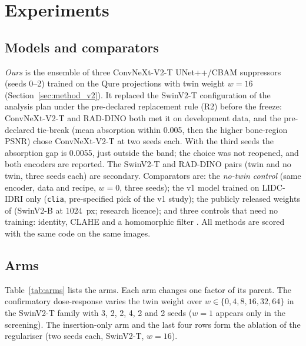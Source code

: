 \section{Experiments}
\label{sec:experiments}
\subsection{Models and comparators}
\emph{Ours} is the ensemble of three ConvNeXt-V2-T UNet++/CBAM suppressors (seeds 0--2) trained on the Qure projections with twin weight $w=16$
(Section~\ref{sec:method_v2}). It replaced the SwinV2-T configuration of the analysis plan under the pre-declared replacement rule (R2) before the
freeze: ConvNeXt-V2-T and RAD-DINO both met it on development data, and the pre-declared tie-break (mean absorption within 0.005, then the
higher bone-region PSNR) chose ConvNeXt-V2-T at two seeds each. With the third seeds the absorption gap is 0.0055, just outside the band; the
choice was not reopened, and both encoders are reported. The SwinV2-T and RAD-DINO pairs (twin and no twin, three seeds each) are secondary.
Comparators are: the \emph{no-twin control} (same encoder, data and recipe, $w=0$, three seeds); the v1 model trained on LIDC-IDRI only (\texttt{clia},
pre-specified pick of the v1 study); the publicly released weights of \citet{angaitkar2026anatomy} (SwinV2-B at $1024$~px; research licence);
and three controls that need no training: identity, CLAHE \citep{zuiderveld1994clahe} and a homomorphic filter
\citep{oppenheim1968homomorphic}. All methods are scored with the same code on the same images.

\subsection{Arms}
Table~\ref{tab:arms} lists the arms. Each arm changes one factor of its parent. The confirmatory dose-response varies the twin weight over
$w\in\{0,4,8,16,32,64\}$ in the SwinV2-T family with 3, 2, 2, 4, 2 and 2 seeds ($w=1$ appears only in the screening). The insertion-only arm and the
last four rows form the ablation of the regulariser (two seeds each, SwinV2-T, $w=16$).

